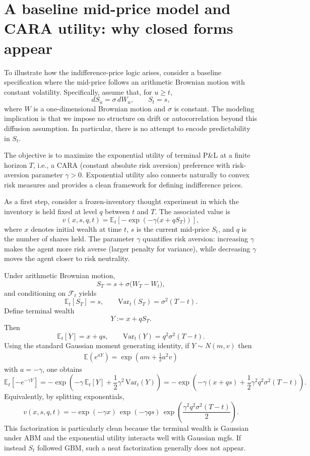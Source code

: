 \documentclass[a4paper,10pt,titlepage,oneside,openany]{book}
\theoremstyle{plain}\newtheorem{theorem}{Theorem}[chapter]
\theoremstyle{definition}\newtheorem{definition}{Definition}[chapter]
\theoremstyle{remark}\newtheorem{remark}{Remark}[chapter]
\begin{document}
\section{A baseline mid-price model and CARA utility: why closed forms appear}
To illustrate how the indifference-price logic arises, consider a baseline specification where the mid-price follows an arithmetic Brownian motion with constant volatility. Specifically, assume that, for $u\ge t$,
\[
dS_u = \sigma\, dW_u,
\qquad S_t=s,
\]
where $W$ is a one-dimensional Brownian motion and $\sigma$ is constant. The modeling implication is that we impose no structure on drift or autocorrelation beyond this diffusion assumption. In particular, there is no attempt to encode predictability in $S_t$.

The objective is to maximize the exponential utility of terminal P\&L at a finite horizon $T$, i.e., a CARA (constant absolute risk aversion) preference with risk-aversion parameter $\gamma>0$. Exponential utility also connects naturally to convex risk measures and provides a clean framework for defining indifference prices.

As a first step, consider a frozen-inventory thought experiment in which the inventory is held fixed at level $q$ between $t$ and $T$. The associated value is
\[
v(x,s,q,t)
=
\mathbb{E}_t\!\left[-\exp\!\left(-\gamma\bigl(x+qS_T\bigr)\right)\right],
\]
where $x$ denotes initial wealth at time $t$, $s$ is the current mid-price $S_t$, and $q$ is the number of shares held. The parameter $\gamma$ quantifies risk aversion: increasing $\gamma$ makes the agent more risk averse (larger penalty for variance), while decreasing $\gamma$ moves the agent closer to risk neutrality.

Under arithmetic Brownian motion,
\[
S_T = s + \sigma\bigl(W_T-W_t\bigr),
\]
and conditioning on $\mathcal{F}_t$ yields
\[
\mathbb{E}_t[S_T]=s,
\qquad
\mathrm{Var}_t(S_T)=\sigma^2(T-t).
\]
Define terminal wealth
\[
Y:=x+qS_T.
\]
Then
\[
\mathbb{E}_t[Y]=x+qs,
\qquad
\mathrm{Var}_t(Y)=q^2\sigma^2(T-t).
\]
Using the standard Gaussian moment generating identity, if $Y\sim N(m,v)$ then 
\begin{align*}
    \mathbb{E}(e^{aY})=\exp(am+\tfrac12a^2v)
\end{align*}
with $a=-\gamma$, one obtains
\[
\mathbb{E}_t\!\left[-e^{-\gamma Y}\right]
=
-\exp\!\left(
-\gamma\,\mathbb{E}_t[Y]
+\frac12\gamma^2\,\mathrm{Var}_t(Y)
\right)
=
-\exp\!\left(
-\gamma(x+qs)
+\frac12\gamma^2 q^2\sigma^2(T-t)
\right).
\]
Equivalently, by splitting exponentials,
\[
v(x,s,q,t)
=
-\exp(-\gamma x)\,
\exp(-\gamma q s)\,
\exp\!\left(\frac{\gamma^2 q^2 \sigma^2 (T-t)}{2}\right).
\]
This factorization is particularly clean because the terminal wealth is Gaussian under ABM and the exponential utility interacts well with Gaussian mgfs. If instead $S_t$ followed GBM, such a neat factorization generally does not appear.
\end{document}
